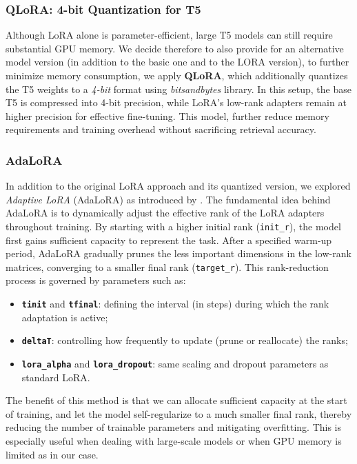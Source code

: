 \subsubsection{QLoRA: 4-bit Quantization for T5}
Although LoRA alone is parameter-efficient, large T5 models can still require substantial GPU memory. We decide therefore to also provide for an alternative model version (in addition to the basic one and to the LORA version), to further minimize memory consumption, we apply \textbf{QLoRA}, which additionally quantizes the T5 weights to a \emph{4-bit} format using \textit{bitsandbytes} library. In this setup, the base T5 is compressed into 4-bit precision, while LoRA’s low-rank adapters remain at higher precision for effective fine-tuning. This model, further reduce memory requirements and training overhead without sacrificing retrieval accuracy.

\subsubsection{AdaLoRA}
In addition to the original LoRA approach and its quantized version, we explored \textit{Adaptive LoRA} (AdaLoRA) as introduced by \cite{liu2024aloraallocatinglowrankadaptation}. The fundamental idea behind AdaLoRA is to dynamically adjust the effective rank of the LoRA adapters throughout training. By starting with a higher initial rank (\texttt{init\_r}), the model first gains sufficient capacity to represent the task. After a specified warm-up period, AdaLoRA gradually prunes the less important dimensions in the low-rank matrices, converging to a smaller final rank (\texttt{target\_r}). This rank-reduction process is governed by parameters such as:
\begin{itemize}
    \item \textbf{\texttt{tinit}} and \textbf{\texttt{tfinal}}: defining the interval (in steps) during which the rank adaptation is active;
    \item \textbf{\texttt{deltaT}}: controlling how frequently to update (prune or reallocate) the ranks;
    \item \textbf{\texttt{lora\_alpha}} and \textbf{\texttt{lora\_dropout}}: same scaling and dropout parameters as standard LoRA.
\end{itemize}
The benefit of this method is that we can allocate sufficient capacity at the start of training, and let the model self-regularize to a much smaller final rank, thereby reducing the number of trainable parameters and mitigating overfitting. This is especially useful when dealing with large-scale models or when GPU memory is limited as in our case.

